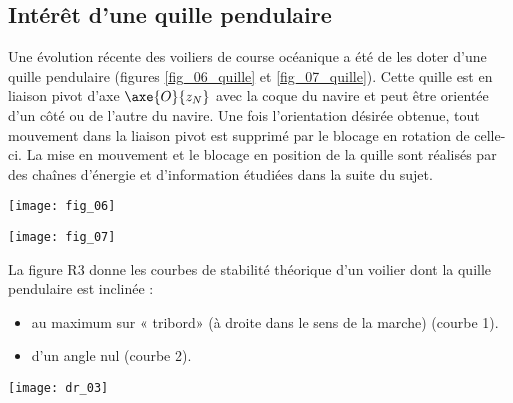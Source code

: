 


\subsection{Intérêt d’une quille pendulaire}

Une évolution récente des voiliers de course océanique a été de les doter d’une quille pendulaire (figures \ref{fig_06_quille} et \ref{fig_07_quille}). Cette quille est en liaison pivot d’axe $\axe{O}{z_N}$ avec la coque du navire et peut être orientée d’un côté ou de l’autre du navire. Une fois l’orientation désirée obtenue, tout mouvement dans la liaison pivot est supprimé par le blocage en rotation de celle-ci. La mise en mouvement et le blocage en position de la quille sont réalisés par des chaînes d’énergie et d’information étudiées dans la suite du sujet. 

\begin{minipage}[b]{.47\linewidth}
\begin{center}
\texttt{[image: fig\_06]}
\end{center}
\end{minipage}\hfill
\begin{minipage}[b]{.47\linewidth}
\begin{center}
\texttt{[image: fig\_07]}
\end{center}
 \end{minipage}


La figure R3  donne les courbes de stabilité théorique d’un voilier dont la quille pendulaire est inclinée :
\begin{itemize}
\item au maximum sur « tribord» (à droite dans le sens de la marche) (courbe 1). 
\item d’un angle nul (courbe 2).
\end{itemize}

\begin{center}
\texttt{[image: dr\_03]}
\end{center}

